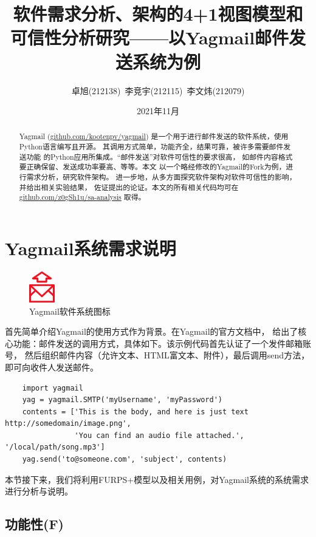 \documentclass[UTF8,12pt,a4paper]{ctexart}
\title{软件需求分析、架构的4+1视图模型和可信性分析研究——以Yagmail邮件发送系统为例}
\author{卓旭(212138)~李竞宇(212115)~李文炜(212079)}
\date{2021年11月}
\begin{document}
\maketitle

    \begin{abstract}
        Yagmail (\url{github.com/kootenpv/yagmail}) 是一个用于进行邮件发送的软件系统，使用Python语言编写且开源。
        其调用方式简单，功能齐全，结果可靠，被许多需要邮件发送功能
        的Python应用所集成。“邮件发送”对软件可信性的要求很高，
        如邮件内容格式要正确保留、发送成功率要高、等等。本文
        以一个略经修改的Yagmail的Fork为例，进行需求分析，研究软件架构。
        进一步地，从多方面探究软件架构对软件可信性的影响，并给出相关实验结果，
        佐证提出的论证。本文的所有相关代码均可在 \url{github.com/z0gSh1u/sa-analysis}
        取得。
    \end{abstract}

\newpage
\tableofcontents

\newpage
\section{Yagmail系统需求说明}
    \begin{figure}[H]
        \centering
        \includegraphics[width=0.1\textwidth]{figure/yagmail-icon.png}
        \caption{Yagmail软件系统图标}
    \end{figure}

    首先简单介绍Yagmail的使用方式作为背景。在Yagmail的官方文档中，
    给出了核心功能：邮件发送的调用方式，具体如下。该示例代码首先认证了一个发件邮箱账号，
    然后组织邮件内容（允许文本、HTML富文本、附件），最后调用send方法，即可向收件人发送邮件。
    
    \begin{lstlisting}
    import yagmail
    yag = yagmail.SMTP('myUsername', 'myPassword')
    contents = ['This is the body, and here is just text http://somedomain/image.png',
                'You can find an audio file attached.', '/local/path/song.mp3']
    yag.send('to@someone.com', 'subject', contents)
    \end{lstlisting}

    本节接下来，我们将利用FURPS+模型\cite{furps}以及相关用例，对Yagmail系统的系统需求进行分析与说明。

\subsection{功能性(F)}
\end{document}

